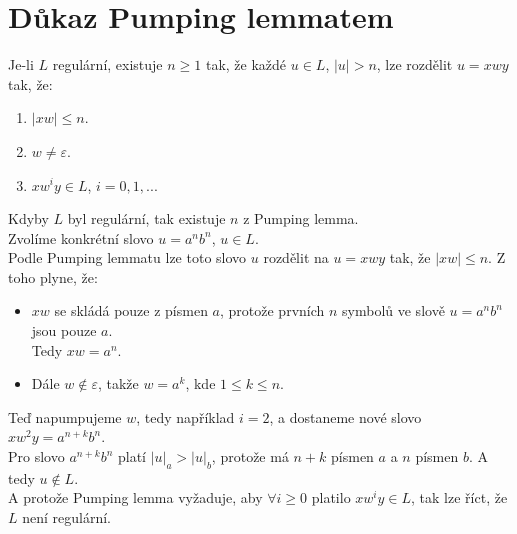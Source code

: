\documentclass[11pt]{article}
\begin{document}
\section{Důkaz Pumping lemmatem}
Je-li $L$ regulární, existuje $n \geq 1$ tak, že každé $u \in L$, $|u|>n$, lze rozdělit $u=xwy$ tak, že:
\begin{enumerate}
    \item $|xw| \leq n$.
    \item $w \neq \varepsilon$.
    \item $xw^iy \in L$, $i=0, 1, ...$
\end{enumerate}
Kdyby $L$ byl regulární, tak existuje $n$ z Pumping lemma.\\
Zvolíme konkrétní slovo $u = a^n b^n$, $u \in L$.\\
Podle Pumping lemmatu lze toto slovo $u$ rozdělit na $u=xwy$ tak, že $|xw| \leq n$. Z toho plyne, že:
    \begin{itemize}
        \item $xw$ se skládá pouze z písmen $a$, protože prvních $n$ symbolů ve slově $u=a^n b^n$ jsou pouze $a$.\\
        Tedy $xw = a^n$.
        \item Dále $w \not\in \varepsilon$, takže $w=a^k$, kde $1 \leq k \leq n$.
    \end{itemize}
Teď napumpujeme $w$, tedy například $i=2$, a dostaneme nové slovo $xw^2y = a^{n+k} b^n$.\\
Pro slovo $a^{n+k} b^n$ platí $|u|_a > |u|_b$, protože má $n+k$ písmen $a$ a $n$ písmen $b$. A tedy $u \not\in L$. \\
A protože Pumping lemma vyžaduje, aby  $\forall i \geq 0$ platilo $xw^iy \in L$, tak lze říct, že $L$ není regulární.


 
\end{document}

